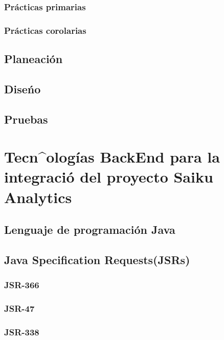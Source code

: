 \begin{spacing}{1.5}
		\subsubsection{Pr\'{a}cticas primarias}
					\lipsum[1]
		\subsubsection{Pr\'{a}cticas corolarias}
					\lipsum[1]
	\subsection{Planeaci\'{o}n}
				\lipsum[1]
	\subsection{Dise\'{n}o}
				\lipsum[1]
	\subsection{Pruebas}
				\lipsum[1]
\section{Tecn^{o}log\'{i}as BackEnd para la integraci\'{o} del proyecto Saiku Analytics}
		\lipsum[1-2]
	\subsection{Lenguaje de programaci\'{o}n Java}
			\lipsum[1-2]
	\subsection{Java Specification Requests(JSRs)}
		\subsubsection{JSR-366}
				\lipsum[1-2]
		\subsubsection{JSR-47}
				\lipsum[1-2]
		\subsubsection{JSR-338}
				\lipsum[1-2]

\end{spacing}
